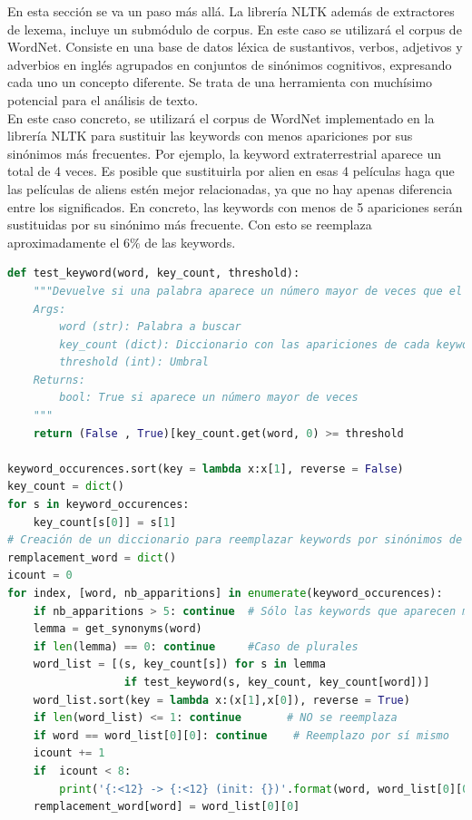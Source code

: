 En esta sección se va un paso más allá. La librería NLTK además de extractores de lexema, incluye un submódulo de corpus. En este caso se utilizará el corpus de WordNet. Consiste en una base de datos léxica de sustantivos, verbos, adjetivos y adverbios en inglés agrupados en conjuntos de sinónimos cognitivos, expresando cada uno un concepto diferente. Se trata de una herramienta con muchísimo potencial para el análisis de texto.\\

En este caso concreto, se utilizará el corpus de WordNet \cite{WordNet} implementado en la librería NLTK para sustituir las keywords con menos apariciones por sus sinónimos más frecuentes. Por ejemplo, la keyword extraterrestrial aparece un total de 4 veces. Es posible que sustituirla por alien en esas 4 películas haga que las películas de aliens estén mejor relacionadas, ya que no hay apenas diferencia entre los significados. En concreto, las keywords con menos de 5 apariciones serán sustituidas por su sinónimo más frecuente. Con esto se reemplaza aproximadamente el $6 \%$ de las keywords.
\begin{lstlisting}[language=Python, caption= Sustitución de las palabras menos frecuentes por sus sinónimos.]
def test_keyword(word, key_count, threshold):
    """Devuelve si una palabra aparece un número mayor de veces que el umbral señalado
    Args:
        word (str): Palabra a buscar
        key_count (dict): Diccionario con las apariciones de cada keyword
        threshold (int): Umbral
    Returns:
        bool: True si aparece un número mayor de veces
    """
    return (False , True)[key_count.get(word, 0) >= threshold
    
keyword_occurences.sort(key = lambda x:x[1], reverse = False)
key_count = dict()
for s in keyword_occurences:
    key_count[s[0]] = s[1]
# Creación de un diccionario para reemplazar keywords por sinónimos de mayor frecuencia
remplacement_word = dict()
icount = 0
for index, [word, nb_apparitions] in enumerate(keyword_occurences):
    if nb_apparitions > 5: continue  # Sólo las keywords que aparecen menos de 5 veces
    lemma = get_synonyms(word)
    if len(lemma) == 0: continue     #Caso de plurales
    word_list = [(s, key_count[s]) for s in lemma 
                  if test_keyword(s, key_count, key_count[word])]
    word_list.sort(key = lambda x:(x[1],x[0]), reverse = True)    
    if len(word_list) <= 1: continue       # NO se reemplaza
    if word == word_list[0][0]: continue    # Reemplazo por sí mismo
    icount += 1
    if  icount < 8:
        print('{:<12} -> {:<12} (init: {})'.format(word, word_list[0][0], word_list))    
    remplacement_word[word] = word_list[0][0]
\end{lstlisting}

